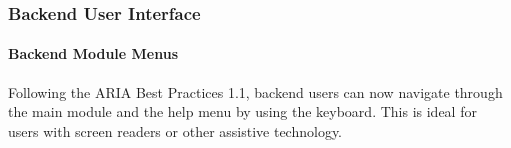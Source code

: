 %

\begin{frame}[fragile]
	\frametitle{Backend User Interface}
	\framesubtitle{Backend Module Menus}

	Following the ARIA Best Practices 1.1, backend users can now navigate through
	the main module and the help menu by using the keyboard. This is ideal for
	users with screen readers or other assistive technology.


\end{frame}

